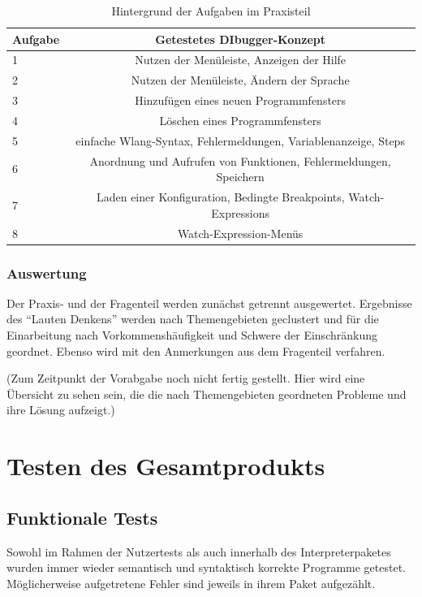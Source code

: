 \documentclass[parskip=full]{scrartcl}
\begin{document}
\begin{table}
\begin{tabular}{l||c}
   	Aufgabe & Getestetes DIbugger-Konzept \\
	\hline
	\hline
	1 & Nutzen der Menüleiste, Anzeigen der Hilfe\\
	2 & Nutzen der Menüleiste, Ändern der Sprache\\
	3 & Hinzufügen eines neuen Programmfensters \\
	4 & Löschen eines Programmfensters \\
	5 & einfache Wlang-Syntax, Fehlermeldungen, Variablenanzeige, Steps \\
	6 & Anordnung und Aufrufen von Funktionen, Fehlermeldungen, Speichern \\
	7 & Laden einer Konfiguration, Bedingte Breakpoints, Watch-Expressions \\
	8 & Watch-Expression-Menüs


\end{tabular}
\label{testfaelle}
\caption{Hintergrund der Aufgaben im Praxisteil}
\end{table}



\subsubsection{Auswertung}

Der Praxis- und der Fragenteil werden zunächst getrennt ausgewertet. Ergebnisse des \enquote{Lauten Denkens} werden nach Themengebieten geclustert und für die Einarbeitung nach Vorkommenshäufigkeit und Schwere der Einschränkung geordnet. Ebenso wird mit den Anmerkungen aus dem Fragenteil verfahren.

(Zum Zeitpunkt der Vorabgabe noch nicht fertig gestellt. Hier wird eine Übersicht zu sehen sein, die die nach Themengebieten geordneten Probleme und ihre Lösung aufzeigt.)



\newpage
\section{Testen des Gesamtprodukts}\label{gesamthwsw}

\subsection{Funktionale Tests}
Sowohl im Rahmen der Nutzertests als auch innerhalb des Interpreterpaketes wurden immer wieder semantisch und syntaktisch korrekte Programme getestet. Möglicherweise aufgetretene Fehler sind jeweils in ihrem Paket aufgezählt.
\end{document}
